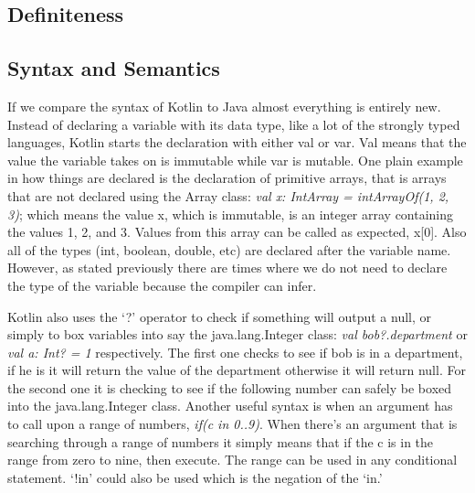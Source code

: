 \begin{center}
\section{Definiteness}
\end{center}
\subsection{Syntax and Semantics}
\hspace{1em} If we compare the syntax of Kotlin to Java almost everything is entirely new. Instead of declaring a variable with its data type, like a lot of the strongly typed languages, Kotlin starts the declaration with either val or var. Val means that the value the variable takes on is immutable while var is mutable. One plain example in how things are declared is the declaration of primitive arrays, that is arrays that are not declared using the Array class: \textit{val x: IntArray = intArrayOf(1, 2, 3)}; which means the value x, which is immutable, is an integer array containing the values 1, 2, and 3. Values from this array can be called as expected, x[0]. Also all of the types (int, boolean, double, etc) are declared after the variable name. However, as stated previously there are times where we do not need to declare the type of the variable because the compiler can infer. 

\hspace{1em} Kotlin also uses the `?' operator to check if something will output a null, or simply to box variables into say the java.lang.Integer class: \textit{val bob?.department} or \textit{val a: Int? = 1} respectively. The first one checks to see if bob is in a department, if he is it will return the value of the department otherwise it will return null. For the second one it is checking to see if the following number can safely be boxed into the java.lang.Integer class. Another useful syntax is when an argument has to call upon a range of numbers, \textit{if(c in 0..9)}. When there's an argument that is searching through a range of numbers it simply means that if the c is in the range from zero to nine, then execute. The range can be used in any conditional statement. `!in' could also be used which is the negation of the `in.'

